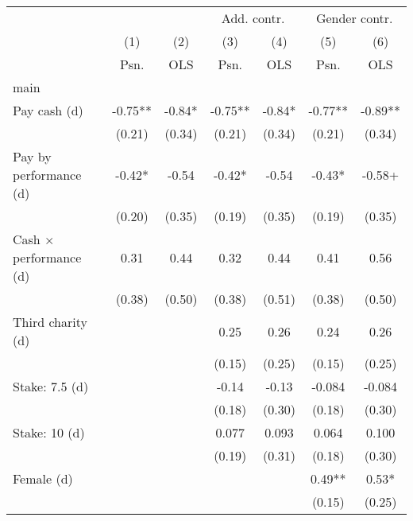 {
\def\sym#1{\ifmmode^{#1}\else\(^{#1}\)\fi}
\begin{tabular}{l*{6}{c}}
\toprule
                &\multicolumn{2}{c}{ }  &\multicolumn{2}{c}{Add. contr.}&\multicolumn{2}{c}{Gender contr.}\\
                &\multicolumn{1}{c}{(1)}&\multicolumn{1}{c}{(2)}&\multicolumn{1}{c}{(3)}&\multicolumn{1}{c}{(4)}&\multicolumn{1}{c}{(5)}&\multicolumn{1}{c}{(6)}\\
                &\multicolumn{1}{c}{Psn.}&\multicolumn{1}{c}{OLS}&\multicolumn{1}{c}{Psn.}&\multicolumn{1}{c}{OLS}&\multicolumn{1}{c}{Psn.}&\multicolumn{1}{c}{OLS}\\
\midrule
main            &           &           &           &           &           &           \\
Pay cash (d)    &    -0.75**&    -0.84* &    -0.75**&    -0.84* &    -0.77**&    -0.89**\\
                &   (0.21)  &   (0.34)  &   (0.21)  &   (0.34)  &   (0.21)  &   (0.34)  \\
Pay by performance (d)&    -0.42* &    -0.54  &    -0.42* &    -0.54  &    -0.43* &    -0.58+ \\
                &   (0.20)  &   (0.35)  &   (0.19)  &   (0.35)  &   (0.19)  &   (0.35)  \\
Cash $\times$ performance (d)&     0.31  &     0.44  &     0.32  &     0.44  &     0.41  &     0.56  \\
                &   (0.38)  &   (0.50)  &   (0.38)  &   (0.51)  &   (0.38)  &   (0.50)  \\
Third charity (d)&           &           &     0.25  &     0.26  &     0.24  &     0.26  \\
                &           &           &   (0.15)  &   (0.25)  &   (0.15)  &   (0.25)  \\
Stake: 7.5 (d)  &           &           &    -0.14  &    -0.13  &   -0.084  &   -0.084  \\
                &           &           &   (0.18)  &   (0.30)  &   (0.18)  &   (0.30)  \\
Stake: 10 (d)   &           &           &    0.077  &    0.093  &    0.064  &    0.100  \\
                &           &           &   (0.19)  &   (0.31)  &   (0.18)  &   (0.30)  \\
Female (d)      &           &           &           &           &     0.49**&     0.53* \\
                &           &           &           &           &   (0.15)  &   (0.25)  \\

\end{tabular}}
